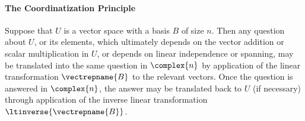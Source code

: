 \paragraph{The Coordinatization Principle}
\label{principle}
\hypertarget{principle}{Suppose} that $U$ is a vector space with a basis $B$ of size $n$.   Then any question about $U$, or its elements, which ultimately depends on the vector addition or scalar multiplication in $U$, or depends on linear independence or spanning, may be translated into the same question in $\complex{n}$ by application of the linear transformation $\vectrepname{B}$ to the relevant vectors.  Once the question is answered in $\complex{n}$, the answer may be translated back to $U$ (if necessary) through application of the inverse linear transformation $\ltinverse{\vectrepname{B}}$.\par\medskip
%
